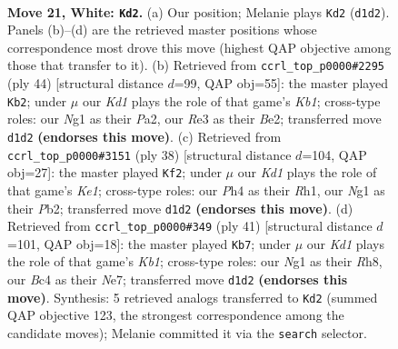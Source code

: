 \documentclass[11pt]{article}
\begin{document}
\clearpage

\begin{figure}[p]\centering
\begin{subfigure}{0.46\textwidth}\centering
\resizebox{\linewidth}{!}{%
\newchessgame
\chessboard[
  setfen={r3kb1r/2n1n1p1/6b1/7p/p1B1pP1P/P3R3/1P4P1/R2K2NN w kq - 2 21},
  showmover=false,
  pgfstyle=straightmove, color=movearrow, markmove={d1-d2}
]}
\caption{}
\end{subfigure}\hfill
\begin{subfigure}{0.46\textwidth}\centering
\resizebox{\linewidth}{!}{%
\newchessgame
\chessboard[
  setfen={4b2r/1pr1kpR1/p3p2p/1n2P3/5P2/1N6/P1P1B1PP/1K5R w - - 1 23},
  showmover=false,
  pgfstyle=straightmove, color=movearrow, markmove={b1-b2}
]}
\caption{}
\end{subfigure}
\\[4pt]
\begin{subfigure}{0.46\textwidth}\centering
\resizebox{\linewidth}{!}{%
\newchessgame
\chessboard[
  setfen={3r3r/1pp1k1p1/3b1pn1/pB5p/P3P2P/2P1B3/1P4P1/3RK2R w K - 0 20},
  showmover=false,
  pgfstyle=straightmove, color=movearrow, markmove={e1-f2}
]}
\caption{}
\end{subfigure}\hfill
\begin{subfigure}{0.46\textwidth}\centering
\resizebox{\linewidth}{!}{%
\newchessgame
\chessboard[
  setfen={1k1r3r/2p1npp1/1p6/p6p/Pn1PPB2/5P2/3RN1PP/5RK1 b - - 2 21},
  showmover=false,
  pgfstyle=straightmove, color=movearrow, markmove={b8-b7}
]}
\caption{}
\end{subfigure}
\caption{\textbf{Move 21, White: \texttt{Kd2}.} (a) Our position; Melanie plays \texttt{Kd2} (\texttt{d1d2}). Panels (b)--(d) are the retrieved master positions whose correspondence most drove this move (highest QAP objective among those that transfer to it). (b) Retrieved from \texttt{ccrl\_top\_p0000\#2295} (ply 44) [structural distance $d$=99, QAP obj=55]: the master played \texttt{Kb2}; under $\mu$ our \emph{Kd1} plays the role of that game's \emph{Kb1}; cross-type roles: our \emph{N}g1 as their \emph{P}a2, our \emph{R}e3 as their \emph{B}e2; transferred move \texttt{d1d2} \textbf{(endorses this move)}. (c) Retrieved from \texttt{ccrl\_top\_p0000\#3151} (ply 38) [structural distance $d$=104, QAP obj=27]: the master played \texttt{Kf2}; under $\mu$ our \emph{Kd1} plays the role of that game's \emph{Ke1}; cross-type roles: our \emph{P}h4 as their \emph{R}h1, our \emph{N}g1 as their \emph{P}b2; transferred move \texttt{d1d2} \textbf{(endorses this move)}. (d) Retrieved from \texttt{ccrl\_top\_p0000\#349} (ply 41) [structural distance $d$=101, QAP obj=18]: the master played \texttt{Kb7}; under $\mu$ our \emph{Kd1} plays the role of that game's \emph{Kb1}; cross-type roles: our \emph{N}g1 as their \emph{R}h8, our \emph{B}c4 as their \emph{N}e7; transferred move \texttt{d1d2} \textbf{(endorses this move)}. Synthesis: 5 retrieved analogs transferred to \texttt{Kd2} (summed QAP objective 123, the strongest correspondence among the candidate moves); Melanie committed it via the \texttt{search} selector.}
\label{fig:thought-m40}
\end{figure}
\end{document}
